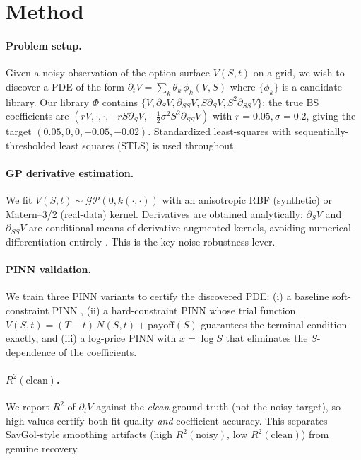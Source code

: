 \documentclass[10pt]{article}
\begin{document}
\section{Method}\label{sec:method}

\paragraph{Problem setup.} Given a noisy observation of the option surface $V(S,t)$ on a grid, we wish to discover a PDE of the form $\partial_t V = \sum_k \theta_k\,\phi_k(V,S)$ where $\{\phi_k\}$ is a candidate library. Our library $\Phi$ contains $\{V, \partial_S V, \partial_{SS}V, S\partial_S V, S^2\partial_{SS}V\}$; the true BS coefficients are $(rV, \cdot, \cdot, -rS\partial_S V, -\tfrac12\sigma^2 S^2 \partial_{SS}V)$ with $r=0.05, \sigma=0.2$, giving the target $(0.05, 0, 0, -0.05, -0.02)$. Standardized least-squares with sequentially-thresholded least squares (STLS) is used throughout.

\paragraph{GP derivative estimation.} We fit $V(S,t)\sim \mathcal{GP}(0, k(\cdot,\cdot))$ with an anisotropic RBF (synthetic) or Matern--3/2 (real-data) kernel. Derivatives are obtained analytically: $\partial_S V$ and $\partial_{SS}V$ are conditional means of derivative-augmented kernels, avoiding numerical differentiation entirely \citep{rasmussen2006gp}. This is the key noise-robustness lever.

\paragraph{PINN validation.} We train three PINN variants to certify the discovered PDE: (i) a baseline soft-constraint PINN \citep{raissi2019pinn,lagaris1998artificial}, (ii) a hard-constraint PINN whose trial function $V(S,t) = (T{-}t)\,N(S,t) + \mathrm{payoff}(S)$ guarantees the terminal condition exactly, and (iii) a log-price PINN with $x=\log S$ that eliminates the $S$-dependence of the coefficients.

\paragraph{$R^2(\text{clean})$.} We report $R^2$ of $\partial_t V$ against the \emph{clean} ground truth (not the noisy target), so high values certify both fit quality \emph{and} coefficient accuracy. This separates SavGol-style smoothing artifacts (high $R^2(\text{noisy})$, low $R^2(\text{clean})$) from genuine recovery.
\end{document}
